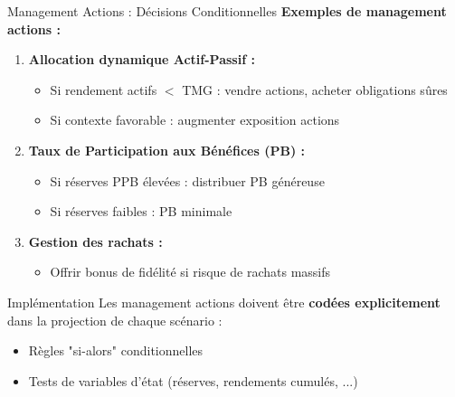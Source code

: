 \documentclass[10pt,aspectratio=169,xcolor={dvipsnames}]{beamer}
\begin{document}
\begin{frame}{Management Actions : Décisions Conditionnelles}
\textbf{Exemples de management actions :}

\begin{enumerate}
    \item \textbf{Allocation dynamique Actif-Passif :}
    \begin{itemize}
        \item Si rendement actifs $<$ TMG : vendre actions, acheter obligations sûres
        \item Si contexte favorable : augmenter exposition actions
    \end{itemize}
    
    \item \textbf{Taux de Participation aux Bénéfices (PB) :}
    \begin{itemize}
        \item Si réserves PPB élevées : distribuer PB généreuse
        \item Si réserves faibles : PB minimale
    \end{itemize}
    
    \item \textbf{Gestion des rachats :}
    \begin{itemize}
        \item Offrir bonus de fidélité si risque de rachats massifs
    \end{itemize}
\end{enumerate}

\vspace{0.3cm}
\begin{alertblock}{Implémentation}
Les management actions doivent être \textbf{codées explicitement} dans la projection de chaque scénario :
\begin{itemize}
    \item Règles "si-alors" conditionnelles
    \item Tests de variables d'état (réserves, rendements cumulés, ...)
\end{itemize}
\end{alertblock}
\end{frame}
\end{document}
